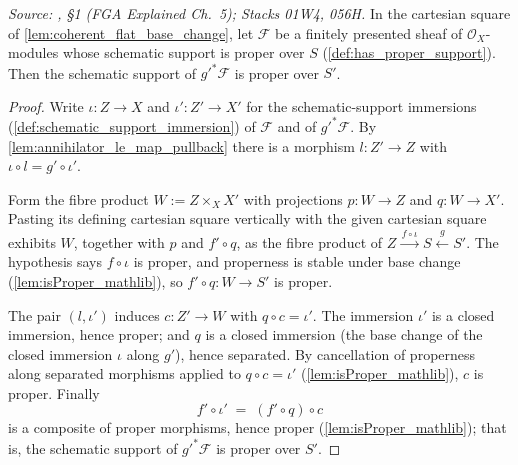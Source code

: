 \begin{lemma}\leanok
  \label{lem:proper_support_base_change}
  \textit{Source: \cite{nitsure-hilbert-quot}, \S 1 (FGA Explained Ch.~5); Stacks 01W4, 056H.}
  In the cartesian square of \cref{lem:coherent_flat_base_change}, let
  \(\mathcal{F}\) be a finitely presented sheaf of
  \(\mathcal{O}_X\)-modules whose schematic support is proper over \(S\)
  (\cref{def:has_proper_support}).  Then the schematic support of
  \(g'^* \mathcal{F}\) is proper over \(S'\).
\end{lemma}
\begin{proof}\leanok
  Write \(\iota : Z \to X\) and \(\iota' : Z' \to X'\) for the
  schematic-support immersions (\cref{def:schematic_support_immersion}) of
  \(\mathcal{F}\) and of \(g'^* \mathcal{F}\).  By
  \cref{lem:annihilator_le_map_pullback} there is a morphism
  \(l : Z' \to Z\) with \(\iota \circ l = g' \circ \iota'\).

  Form the fibre product \(W := Z \times_X X'\) with projections
  \(p : W \to Z\) and \(q : W \to X'\).  Pasting its defining cartesian
  square vertically with the given cartesian square exhibits \(W\), together
  with \(p\) and \(f' \circ q\), as the fibre product of
  \(Z \xrightarrow{\,f \circ \iota\,} S \xleftarrow{\,g\,} S'\).  The
  hypothesis says \(f \circ \iota\) is proper, and properness is stable under
  base change (\cref{lem:isProper_mathlib}), so \(f' \circ q : W \to S'\) is
  proper.

  The pair \((l, \iota')\) induces \(c : Z' \to W\) with
  \(q \circ c = \iota'\).  The immersion \(\iota'\) is a closed immersion,
  hence proper; and \(q\) is a closed immersion (the base change of the
  closed immersion \(\iota\) along \(g'\)), hence separated.  By cancellation
  of properness along separated morphisms applied to \(q \circ c = \iota'\)
  (\cref{lem:isProper_mathlib}), \(c\) is proper.  Finally
  \[
    f' \circ \iota' \;=\; (f' \circ q) \circ c
  \]
  is a composite of proper morphisms, hence proper
  (\cref{lem:isProper_mathlib}); that is, the schematic support of
  \(g'^* \mathcal{F}\) is proper over \(S'\).
\end{proof}

